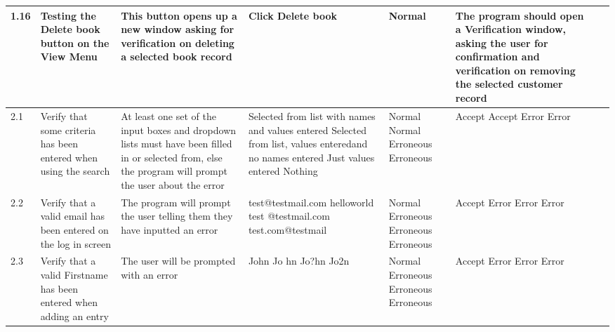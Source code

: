 \begin{landscape}
\begin{center}
\begin{longtable}{|p{1.5cm}|p{2.5cm}|p{2.5cm}|p{2cm}|p{2cm}|p{2cm}|p{2cm}|p{2cm}|}
        1.16 & Testing the Delete book button on the View Menu & This button opens up a new window asking for verification on deleting a selected book record & Click Delete book & Normal & The program should open a Verification window, asking the user for confirmation and verification on removing the selected customer record & & \\ \hline
        2.1 & Verify that some criteria has been entered when using the search & At least one set of the input boxes and dropdown lists must have been filled in or selected from, else the program will prompt the user about the error & Selected from list with names and values entered \newline Selected from list, values enteredand no names entered \newline Just values entered \newline Nothing   & Normal \newline Normal \newline Erroneous \newline Erroneous & Accept \newline Accept \newline Error \newline Error & & \\ \hline
        2.2 & Verify that a valid email has been entered on the log in screen &  The program will prompt the user telling them they have inputted an error & test@testmail.com \newline helloworld \newline test @testmail.com \newline test.com@testmail & Normal \newline Erroneous \newline Erroneous \newline Erroneous & Accept \newline Error \newline Error \newline Error & & \\ \hline
        2.3 & Verify that a valid Firstname has been entered when adding an entry & The user will be prompted with an error & John \newline Jo hn \newline Jo?hn \newline Jo2n & Normal \newline Erroneous \newline Erroneous \newline Erroneous & Accept \newline Error \newline Error \newline Error & & \\ \hline

\end{longtable}
\end{center}
\end{landscape}
